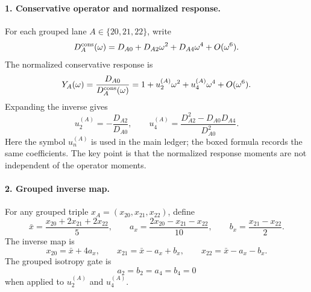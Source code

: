 \paragraph{1. Conservative operator and normalized response.}
For each grouped lane \(A\in\{20,21,22\}\), write
\begin{equation}
\label{eq:app-stage022-d-operator}
D_A^{\rm cons}(\omega)=D_{A0}+D_{A2}\omega^2+D_{A4}\omega^4+O(\omega^6).
\end{equation}
The normalized conservative response is
\begin{equation}
\label{eq:app-stage022-y-response}
Y_A(\omega)=\frac{D_{A0}}{D_A^{\rm cons}(\omega)}
=1+u_2^{(A)}\omega^2+u_4^{(A)}\omega^4+O(\omega^6).
\end{equation}
Expanding the inverse gives
\begin{equation}
\label{eq:app-stage022-u2u4}
\boxed{
u_2^{(A)}=-\frac{D_{A2}}{D_{A0}},
\qquad
u_4^{(A)}=\frac{D_{A2}^2-D_{A0}D_{A4}}{D_{A0}^2}}.
\end{equation}
Here the symbol \(u_n^{(A)}\) is used in the main ledger; the boxed formula records the same coefficients.  The key point is that the normalized response moments are not independent of the operator moments.

\paragraph{2. Grouped inverse map.}
For any grouped triple \(x_A=(x_{20},x_{21},x_{22})\), define
\begin{equation}
\label{eq:app-stage022-grouped-defs}
\bar x=\frac{x_{20}+2x_{21}+2x_{22}}{5},
\qquad
a_x=\frac{2x_{20}-x_{21}-x_{22}}{10},
\qquad
b_x=\frac{x_{21}-x_{22}}{2}.
\end{equation}
The inverse map is
\begin{equation}
\label{eq:app-stage022-grouped-inverse}
\boxed{
x_{20}=\bar x+4a_x,
\qquad
x_{21}=\bar x-a_x+b_x,
\qquad
x_{22}=\bar x-a_x-b_x}.
\end{equation}
The grouped isotropy gate is
\begin{equation}
\label{eq:app-stage022-isotropy-gate}
a_2=b_2=a_4=b_4=0
\end{equation}
when applied to \(u_2^{(A)}\) and \(u_4^{(A)}\).


